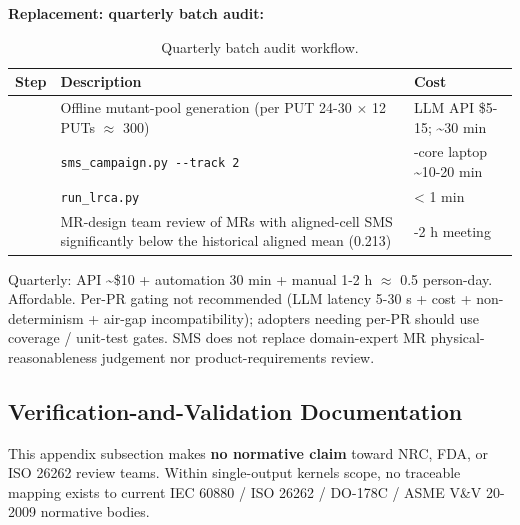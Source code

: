 \documentclass[review,12pt,authoryear]{elsarticle}
\begin{document}
\textbf{Replacement: quarterly batch audit:}

{\def\LTcaptype{table} %
\begin{longtable}[]{@{}
  >{\raggedright\arraybackslash}p{}
  >{\raggedright\arraybackslash}p{}
  >{\raggedright\arraybackslash}p{}@{}}
\caption{Quarterly batch audit workflow.}\label{tab:p2-26}\\
\toprule\noalign{}
\begin{minipage}[b]{\linewidth}\raggedright
Step
\end{minipage} & \begin{minipage}[b]{\linewidth}\raggedright
Description
\end{minipage} & \begin{minipage}[b]{\linewidth}\raggedright
Cost
\end{minipage} \\
\midrule\noalign{}
\endfirsthead
\endhead
\bottomrule\noalign{}
\endlastfoot
1 & Offline mutant-pool generation (per PUT 24-30 $\times$ 12 PUTs $\approx$ 300) & LLM
API \$5-15; \textasciitilde30 min \\
2 & \texttt{sms\_campaign.py\ -\/-track\ 2} & 4-core laptop
\textasciitilde10-20 min \\
3 & \texttt{run\_lrca.py} & \textless{} 1 min \\
4 & MR-design team review of MRs with aligned-cell SMS significantly
below the historical aligned mean (0.213) & 1-2 h meeting \\
\end{longtable}
}

Quarterly: API \textasciitilde\$10 + automation 30 min + manual 1-2 h $\approx$
0.5 person-day. Affordable. Per-PR gating not recommended (LLM latency
5-30 s + cost + non-determinism + air-gap incompatibility); adopters
needing per-PR should use coverage / unit-test gates. SMS does not
replace domain-expert MR physical-reasonableness judgement nor
product-requirements review.

\subsection{Verification-and-Validation Documentation}\label{e.3-vv-documentation-conceptual-complementarity-with-asme-vv-20-2009}

This appendix subsection makes \textbf{no normative claim} toward NRC,
FDA, or ISO 26262 review teams. Within single-output kernels scope, no
traceable mapping exists to current IEC 60880 / ISO 26262 / DO-178C /
ASME V\&V 20-2009 normative bodies.
\end{document}
